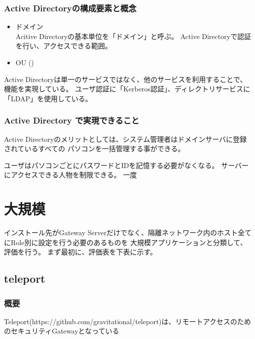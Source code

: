 \documentclass[12pt,a4paper,titlepage]{jsarticle}
\begin{document}

\subsubsection*{Active Directoryの構成要素と概念}

\begin{itemize}
    \item ドメイン\mbox{}\\
    Acitive Directoryの基本単位を「ドメイン」と呼ぶ。
    Active Directoryで認証を行い、アクセスできる範囲。
    
    \item OU ()




\end{itemize}


Active Directoryは単一のサービスではなく、他のサービスを利用することで、機能を実現している。
ユーザ認証に「Kerberos認証」、ディレクトリサービスに「LDAP」を使用している。


\subsubsection*{Active Directory で実現できること}
Active Directoryのメリットとしては、システム管理者はドメインサーバに登録されているすべての
パソコンを一括管理する事ができる。

ユーザはパソコンごとにパスワードとIDを記憶する必要がなくなる。
サーバーにアクセスできる人物を制限できる。
一度





\fi



\section{大規模}
インストール先がGateway Serverだけでなく、隔離ネットワーク内のホスト全てにRole別に設定を行う必要のあるものを
大規模アプリケーションと分類して、評価を行う。
まず最初に、評価表を下表に示す。


\subsection{teleport}

\subsubsection*{概要}
Teleport(https://github.com/gravitational/teleport)は、リモートアクセスのためのセキュリティGatewayとなっている
\end{document}
